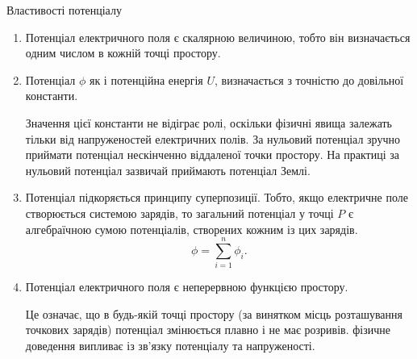 \documentclass{beamer}
\begin{document}
\begin{frame}{Властивості потенціалу}
	\begin{enumerate}\justifying
		\item Потенціал електричного поля є \alert{скалярною величиною},
		      тобто він визначається одним числом в кожній точці простору.
		\item Потенціал $\phi$ як і потенційна енергія $U$, визначається
		      \alert{з точністю до довільної константи}.

		      \begin{alertblock}{}\justifying\small
			      Значення цієї константи не відіграє ролі, оскільки фізичні явища залежать
			      тільки від напруженостей електричних полів. За нульовий потенціал зручно
			      приймати потенціал нескінченно віддаленої точки простору. На практиці за
			      нульовий потенціал зазвичай приймають потенціал Землі.
		      \end{alertblock}

		\item Потенціал підкоряється принципу суперпозиції. Тобто, якщо
		      електричне поле створюється системою зарядів, то загальний
		      потенціал у точці $P$ є \alert{алгебраїчною сумою
			      потенціалів}, створених кожним із цих зарядів.
		      \begin{equation*}
			      \phi = \sum_{i = 1}^{n} \phi_i.
		      \end{equation*}

		\item Потенціал електричного поля є \alert{неперервною функцією
			      простору}.

		      \begin{block}{}\justifying\small
			      Це означає, що в будь-якій точці простору (за
			      винятком  місць розташування точкових зарядів) потенціал
			      змінюється плавно і
			      не має розривів. \alert{фізичне доведення випливає із зв'язку
				      потенціалу та напруженості}.
		      \end{block}
	\end{enumerate}
\end{frame}
\end{document}
